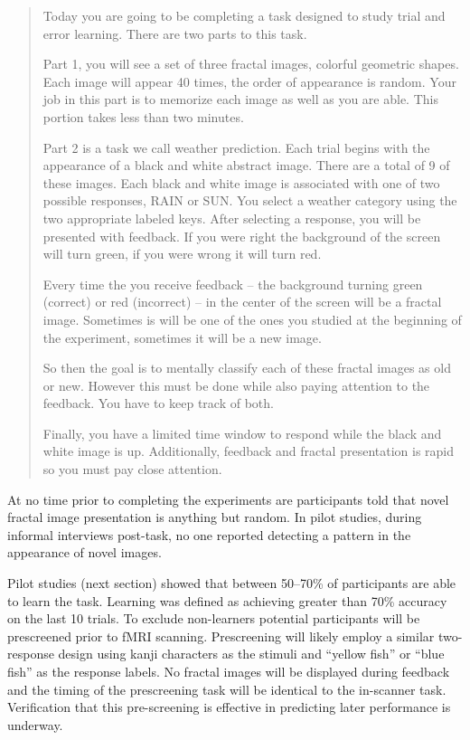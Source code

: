 \documentclass[doc]{apa}        %
\begin{document}
\begin{quote}
Today you are going to be completing a task designed to study trial and error learning.  There are two parts to this task.

Part 1, you will see a set of three fractal images, colorful geometric shapes.  Each image will appear 40 times, the order of appearance is random.  Your job in this part is to memorize each image as well as you are able.  This portion takes less than two minutes.

Part 2 is a task we call weather prediction.  Each trial begins with the appearance of a black and white abstract image.  There are a total of 9 of these images.  Each black and white image is associated with one of two possible responses, RAIN or SUN.  You select a weather category using the two appropriate labeled keys.  After selecting a response, you will be presented with feedback.  If you were right the background of the screen will turn green, if you were wrong it will turn red.

Every time the you receive feedback -- the background turning green (correct) or red (incorrect) -- in the center of the screen will be a fractal image.  Sometimes is will be one of the ones you studied at the beginning of the experiment, sometimes it will be a new image.

So then the goal is to mentally classify each of these fractal images as old or new.  However this must be done while also paying attention to the feedback.  You have to keep track of both.

Finally, you have a limited time window to respond while the black and white image is up.  Additionally, feedback and fractal presentation is rapid so you must pay close attention.
\end{quote}

At no time prior to completing the experiments are participants told that novel fractal image presentation is anything but random.  In pilot studies, during informal interviews post-task, no one reported detecting a pattern in the appearance of novel images.

Pilot studies (next section) showed that between 50--70\% of participants are able to learn the task.  Learning was defined as achieving greater than 70\% accuracy on the last 10 trials.  To exclude non-learners potential participants will be prescreened prior to fMRI scanning.  Prescreening will likely employ a similar two-response design using kanji characters as the stimuli and ``yellow fish'' or ``blue fish'' as the response labels.  No fractal images will be displayed during feedback and the timing of the prescreening task will be identical to the in-scanner task. Verification that this pre-screening is effective in predicting later performance is underway.
\end{document}
